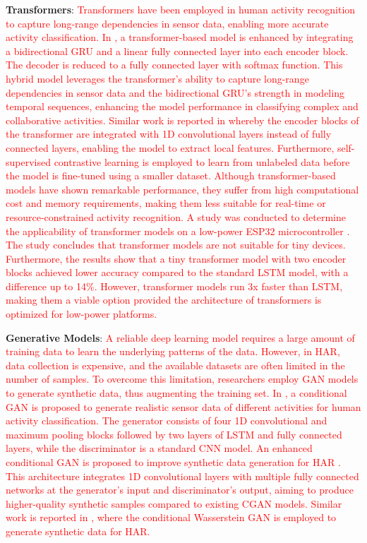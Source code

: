\documentclass[preprint,12pt]{elsarticle}
\begin{document}
\textbf{Transformers}: \textcolor{red}{Transformers have been employed in human activity recognition to capture long-range dependencies in sensor data, enabling more accurate activity classification. In \citep{chen_transformer_2022}, a transformer-based model is enhanced by integrating a bidirectional GRU and a linear fully connected layer into each encoder block. The decoder is reduced to a fully connected layer with softmax function. This hybrid model leverages the transformer's ability to capture long-range dependencies in sensor data and the bidirectional GRU's strength in modeling temporal sequences, enhancing the model performance in classifying complex and collaborative activities. Similar work is reported in \citep{sun_efficient_2024} whereby the encoder blocks of the transformer are integrated with 1D convolutional layers instead of fully connected layers, enabling the model to extract local features. Furthermore, self-supervised contrastive learning is employed to learn from unlabeled data before the model is fine-tuned using a smaller dataset. Although transformer-based models have shown remarkable performance, they suffer from high computational cost and memory requirements, making them less suitable for real-time or resource-constrained activity recognition. A study was conducted to determine the applicability of transformer models on a low-power ESP32 microcontroller \citep{lattanzi_are_2025}. The study concludes that transformer models are not suitable for tiny devices. Furthermore, the results show that a tiny transformer model with two encoder blocks achieved lower accuracy compared to the standard LSTM model, with a difference up to 14\%. However, transformer models run 3x faster than LSTM, making them a viable option provided the architecture of transformers is optimized for low-power platforms.}

\textbf{Generative Models}: \textcolor{red}{A reliable deep learning model requires a large amount of training data to learn the underlying patterns of the data. However, in HAR, data collection is expensive, and the available datasets are often limited in the number of samples. To overcome this limitation, researchers employ GAN models to generate synthetic data, thus augmenting the training set. In \citep{chan_unified_2021}, a conditional GAN is proposed to generate realistic sensor data of different activities for human activity classification. The generator consists of four 1D convolutional and maximum pooling blocks followed by two layers of LSTM and fully connected layers, while the discriminator is a standard CNN model. An enhanced conditional GAN is proposed to improve synthetic data generation for HAR \citep{jimale_fully_2022}. This architecture integrates 1D convolutional layers with multiple fully connected networks at the generator's input and discriminator's output, aiming to produce higher-quality synthetic samples compared to existing CGAN models. Similar work is reported in \citep{lupion_data_2024}, where the conditional Wasserstein GAN is employed to generate synthetic data for HAR. }
\end{document}

